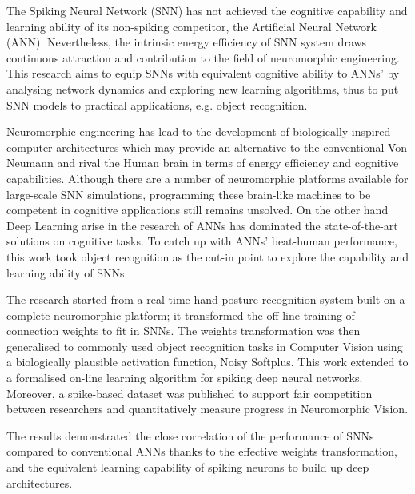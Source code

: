 The Spiking Neural Network (SNN) has not achieved the cognitive capability and learning ability of its non-spiking competitor, the Artificial Neural Network (ANN).
Nevertheless, the intrinsic energy efficiency of SNN system draws continuous attraction and contribution to the field of neuromorphic engineering.
This research aims to equip SNNs with equivalent cognitive ability to ANNs' by analysing network dynamics and exploring new learning algorithms, thus to put SNN models to practical applications, e.g. object recognition.

Neuromorphic engineering has lead to the development of biologically-inspired computer architectures which may provide an alternative to the conventional Von Neumann and rival the Human brain in terms of energy efficiency and cognitive capabilities.
Although there are a number of neuromorphic platforms available for large-scale SNN simulations, programming these brain-like machines to be competent in cognitive applications still remains unsolved.
On the other hand Deep Learning arise in the research of ANNs has dominated the state-of-the-art solutions on cognitive tasks.
To catch up with ANNs' beat-human performance, this work took object recognition as the cut-in point to explore the capability and learning ability of SNNs.

The research started from a real-time hand posture recognition system built on a complete neuromorphic platform; it transformed the off-line training of connection weights to fit in SNNs.
The weights transformation was then generalised to commonly used object recognition tasks in Computer Vision using a biologically plausible activation function, Noisy Softplus.
This work extended to a formalised on-line learning algorithm for spiking deep neural networks.
Moreover, a spike-based dataset was published to support fair competition between researchers and quantitatively measure progress in Neuromorphic Vision.

The results demonstrated the close correlation of the performance of SNNs compared to conventional ANNs thanks to the effective weights transformation, and the equivalent learning capability of spiking neurons to build up deep architectures.
